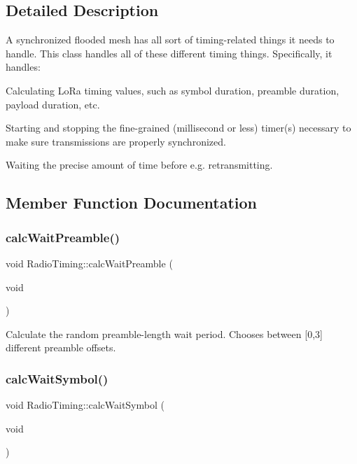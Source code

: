 \subsection{Detailed Description}
A synchronized flooded mesh has all sort of timing-\/related things it needs to handle. This class handles all of these different timing things. Specifically, it handles\+:
\begin{DoxyItemize}
\item Calculating Lo\+Ra timing values, such as symbol duration, preamble duration, payload duration, etc.
\item Starting and stopping the fine-\/grained (millisecond or less) timer(s) necessary to make sure transmissions are properly synchronized.
\item Waiting the precise amount of time before e.\+g. retransmitting. 
\end{DoxyItemize}

\subsection{Member Function Documentation}
\mbox{\label{classRadioTiming_ab88cd62548731862e0a24c986bf095bf}} 
\subsubsection{\texorpdfstring{calc\+Wait\+Preamble()}{calcWaitPreamble()}}
{\footnotesize\ttfamily void Radio\+Timing\+::calc\+Wait\+Preamble (\begin{DoxyParamCaption}\item[{void}]{ }\end{DoxyParamCaption})}

Calculate the random preamble-\/length wait period. Chooses between \mbox{[}0,3\mbox{]} different preamble offsets. \mbox{\label{classRadioTiming_a763af2aa098f7b311c149dbf062d40a2}} 
\subsubsection{\texorpdfstring{calc\+Wait\+Symbol()}{calcWaitSymbol()}}
{\footnotesize\ttfamily void Radio\+Timing\+::calc\+Wait\+Symbol (\begin{DoxyParamCaption}\item[{void}]{ }\end{DoxyParamCaption})}

